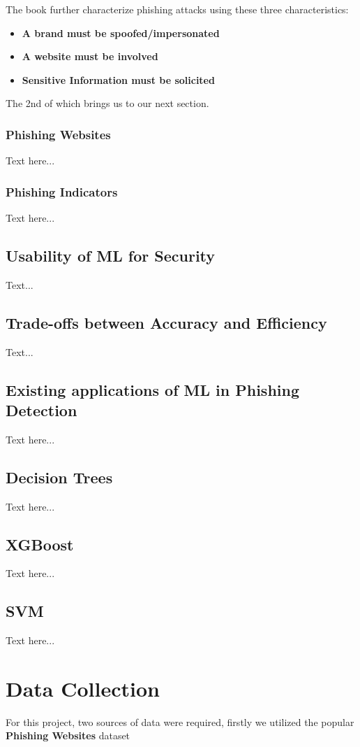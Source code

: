 \documentclass{sigkddExp}
\begin{document}
\vspace{1em}

The book \cite{Ramzan2010} further characterize phishing attacks using these three characteristics:

\begin{itemize}
	\item \textbf{A brand must be spoofed/impersonated}
	\item \textbf{A website must be involved}
	\item \textbf{Sensitive Information must be solicited}
\end{itemize}

The 2nd of which brings us to our next section.
\subsubsection{Phishing Websites}
Text here...
\subsubsection{Phishing Indicators}
Text here...
\subsection{Usability of ML for Security}
Text...
\subsection{Trade-offs between Accuracy and Efficiency}
Text...
\subsection{Existing applications of ML in Phishing Detection}
Text here...
\subsection{Decision Trees}
Text here...
\subsection{XGBoost}
Text here...
\subsection{SVM}
Text here...

\section{Data Collection}
For this project, two sources of data were required, firstly we utilized the popular \textbf{Phishing Websites} dataset
\end{document}
